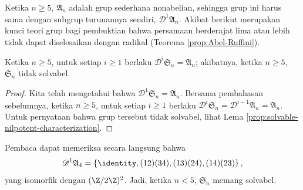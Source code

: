 Ketika $n \geq 5$, $\mathfrak{A}_n$ adalah grup sederhana nonabelian, sehingga grup ini harus sama dengan subgrup turunannya sendiri, $\mathscr{D}^1 \mathfrak{A}_n$. Akibat berikut merupakan kunci teori grup bagi pembuktian bahwa persamaan berderajat lima atau lebih tidak dapat diselesaikan dengan radikal (Teorema \ref{prop:Abel-Ruffini}).
\begin{corollary}\label{prop:S_n-unsolvable}
	Ketika $n \geq 5$, untuk setiap $i \geq 1$ berlaku $\mathscr{D}^i \mathfrak{S}_n = \mathfrak{A}_n$; akibatnya, ketika $n \geq 5$, $\mathfrak{S}_n$ tidak solvabel.
\end{corollary}
\begin{proof}
	Kita telah mengetahui bahwa $\mathscr{D}^1 \mathfrak{S}_n = \mathfrak{A}_n$. Bersama pembahasan sebelumnya, ketika $n \geq 5$, untuk setiap $i \geq 1$ berlaku $\mathscr{D}^i \mathfrak{S}_n = \mathscr{D}^{i-1} \mathfrak{A}_n = \mathfrak{A}_n$. Untuk pernyataan bahwa grup tersebut tidak solvabel, lihat Lema \ref{prop:solvable-nilpotent-characterization}.
\end{proof}

Pembaca dapat memeriksa secara langsung bahwa \[ \mathscr{D}^1 \mathfrak{A}_4 = \left\{\identity, (1 2)(3 4), (1 3) (2 4), (1 4)(2 3)\right\} , \] yang isomorfik dengan $(\Z/2\Z)^2$. Jadi, ketika $n < 5$, $\mathfrak{S}_n$ memang solvabel.

